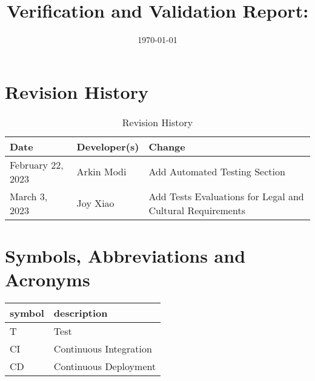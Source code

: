 \documentclass[12pt, titlepage]{article}
\begin{document}
\title{Verification and Validation Report: \progname}
\author{\authname}
\date{\today}

\maketitle


\section{Revision History}

\begin{table}[hp]
	\caption{Revision History} \label{TblRevisionHistory}
	\begin{tabularx}{\textwidth}{llX}
		\toprule
		\textbf{Date}     & \textbf{Developer(s)} & \textbf{Change}                                           \\
		\midrule
		February 22, 2023 & Arkin Modi            & Add Automated Testing Section                             \\
		March 3, 2023     & Joy Xiao              & Add Tests Evaluations for Legal and Cultural Requirements \\

		\bottomrule
	\end{tabularx}
\end{table}
\newpage

\section{Symbols, Abbreviations and Acronyms}

\renewcommand{\arraystretch}{1.2}
\begin{tabular}{l l}
	\toprule
	\textbf{symbol} & \textbf{description}   \\
	\midrule
	T               & Test                   \\
	CI              & Continuous Integration \\
	CD              & Continuous Deployment  \\
	\bottomrule
\end{tabular}\\

\newpage

\tableofcontents

\listoftables %

\listoffigures %

\newpage
\end{document}
